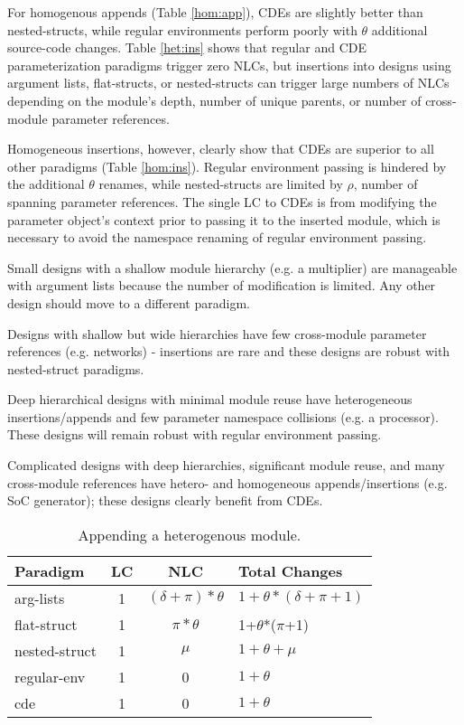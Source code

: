 For homogenous appends (Table \ref{hom:app}), CDEs are slightly better than nested-structs, while regular environments perform poorly with $\theta$ additional source-code changes.
Table \ref{het:ins} shows that regular and CDE parameterization paradigms trigger zero NLCs,
but insertions into designs using argument lists, flat-structs, or nested-structs can trigger large numbers of NLCs depending on the module's depth, number of unique parents, or number of cross-module parameter references.

Homogeneous insertions, however, clearly show that CDEs are superior to all other paradigms (Table \ref{hom:ins}).
Regular environment passing is hindered by the additional $\theta$ renames, while nested-structs are limited by $\rho$, number of spanning parameter references. 
The single LC to CDEs is from modifying the parameter object's context prior to passing it to the inserted module, which is necessary to avoid the namespace renaming of regular environment passing.


Small designs with a shallow module hierarchy (e.g. a multiplier) are manageable with argument lists because the number of modification is limited. Any other design should move to a different paradigm.

Designs with shallow but wide hierarchies have few cross-module parameter references (e.g. networks) - insertions are rare and these designs are robust with nested-struct paradigms.

Deep hierarchical designs with minimal module reuse have heterogeneous insertions/appends and few parameter namespace collisions (e.g. a processor). These designs will remain robust with regular environment passing.

Complicated designs with deep hierarchies, significant module reuse, and many cross-module references have hetero- and homogeneous appends/insertions (e.g. SoC generator); these designs clearly benefit from CDEs.


\begin{table}
\centering
\begin{tabular*}{0.45\textwidth}{lccl}
\toprule
Paradigm    & LC & NLC & Total Changes\\
\midrule
arg-lists      &  1 & $(\delta+\pi)*\theta$ & $1+\theta*(\delta+\pi+1)$  \\
flat-struct  &  1 & $\pi*\theta$ &  1+$\theta$*($\pi$+1)  \\
nested-struct    &  1 & $\mu$ &  $1+\theta+\mu$  \\
regular-env    &  1 & 0 & $1+\theta$ \\
cde &  1 & 0 & $1+\theta$  \\
\bottomrule
\end{tabular*}
\caption{Appending a heterogenous module.}
\label{het:app}
\end{table}

